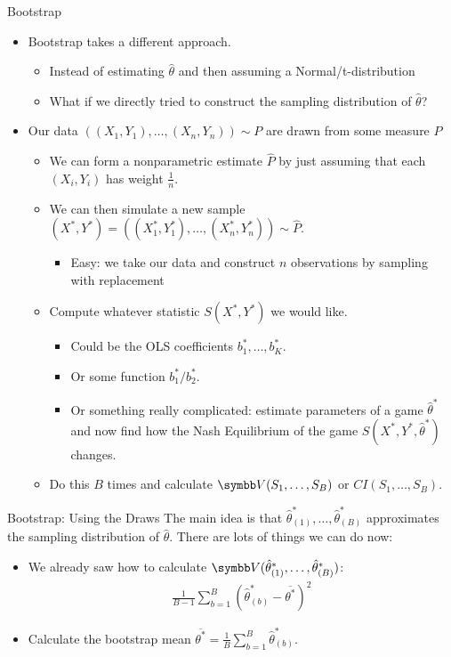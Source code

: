 \documentclass[aspectratio=169,11pt]{beamer}
\begin{document}
\begin{frame}{Bootstrap}
\begin{itemize}
\item Bootstrap takes a different approach.
\begin{itemize}
\item Instead of estimating $\hat{\theta}$ and then assuming a Normal/t-distribution
\item What if we directly tried to construct the \alert{sampling distribution} of $\hat{\theta}$?
\end{itemize}
\item Our data $((X_1,Y_1),\ldots,(X_n,Y_n)) \sim P$ are drawn from some measure $P$
\begin{itemize}
\item We can form a \alert{nonparametric estimate} $\hat{P}$ by just assuming that each $(X_i,Y_i)$ has weight $\frac{1}{n}$.
\item We can then simulate a new sample $(X^{*},Y^{*}) = ((X_1^{*},Y_1^{*}),\ldots, (X_n^{*}, Y_n^{*})) \sim \hat{P}$.
\begin{itemize}
\item Easy: we take our data and construct $n$ observations by \alert{sampling with replacement} 
\end{itemize}
\item Compute whatever statistic $S(X^*,Y^*)$ we would like.
\begin{itemize}
\item Could be the OLS coefficients $b_1^{*},\ldots, b_K^{*}$.
\item Or some function $b_1^{*}/b_2^{*}$.
\item Or something really complicated: estimate parameters of a game $\hat{\theta}^*$ and now find how the Nash Equilibrium of the game $S(X^{*},Y^{*},\hat{\theta}^*)$ changes.
\end{itemize}
\item Do this $B$ times and calculate $\Var(S_1,\ldots,S_B)$ or $CI(S_1,\ldots, S_B)$.
\end{itemize}
\end{itemize}
\end{frame}


\begin{frame}{Bootstrap: Using the Draws}
\small
The main idea is that $\hat{\theta}^{*}_{(1)},\ldots, \hat{\theta}^{*}_{(B)}$ approximates the \alert{sampling distribution} of $\hat{\theta}$. There are lots of things we can do now:
\begin{itemize}
\item We already saw how to calculate $\Var(\hat{\theta}^{*}_{(1)},\ldots, \hat{\theta}^{*}_{(B)})$:
\begin{eqnarray*}
\frac{1}{B-1} \sum_{b=1}^B (\hat{\theta}_{(b)}^* - \overline{\theta^{*}})^2
\end{eqnarray*}
\item Calculate the bootstrap mean $\overline{\theta^{*}} = \frac{1}{B} \sum_{b=1}^B \hat{\theta}_{(b)}^*$.
\end{itemize}
\end{frame}
\end{document}
